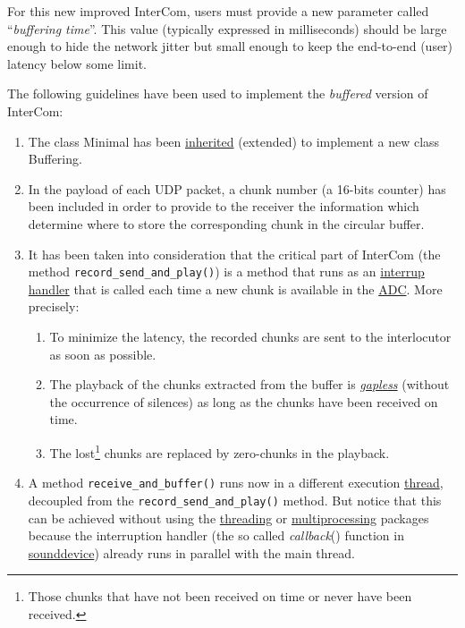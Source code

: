 For this new improved InterCom, users must provide a new parameter
called ``\emph{buffering time}''. This value (typically expressed in
milliseconds) should be large enough to hide the network jitter but
small enough to keep the end-to-end (user) latency below some limit.

The following guidelines have been used to implement the
\emph{buffered} version of InterCom:

\begin{enumerate}
\item The class Minimal has been
  \href{https://en.wikipedia.org/wiki/Inheritance_(object-oriented_programming)}{inherited}
  (extended) to implement a new class Buffering.
\item In the payload of each UDP packet, a chunk number (a 16-bits
  counter) has been included in order to provide to the receiver the
  information which determine where to store the corresponding chunk in
  the circular buffer.
\item It has been taken into consideration that the critical part of
  InterCom (the method \verb|record_send_and_play()|) is a method that
  runs as an
  \href{https://en.wikipedia.org/wiki/Interrupt_handler}{interrup
    handler} that is called each time a new chunk is available in the
  \href{https://en.wikipedia.org/wiki/Analog-to-digital_converter}{ADC}. More
  precisely:
  \begin{enumerate}
  \item To minimize the latency, the recorded chunks are sent
    to the interlocutor as soon as possible.
  \item The playback of the chunks extracted from the buffer is
    \href{https://en.wikipedia.org/wiki/Gapless_playback}{\emph{gapless}}
    (without the occurrence of silences) as long as the chunks have
    been received on time.
  \item The lost\footnote{Those chunks that have not been
  received on time or never have been received.} chunks are replaced
    by zero-chunks in the playback.
  \end{enumerate}
\item A method \verb|receive_and_buffer()| runs now in a different
  execution
  \href{https://en.wikipedia.org/wiki/Thread_(computing)}{thread},
  decoupled from the \verb|record_send_and_play()| method. But notice
  that this can be achieved without using the
  \href{https://docs.python.org/3/library/threading.html}{threading}
  or
  \href{https://docs.python.org/3/library/multiprocessing.html}{multiprocessing}
  packages because the interruption handler (the so called
  \emph{callback}() function in
  \href{https://python-sounddevice.readthedocs.io/en/0.3.14/api.html}{sounddevice})
  already runs in parallel with the main thread.
\end{enumerate}

